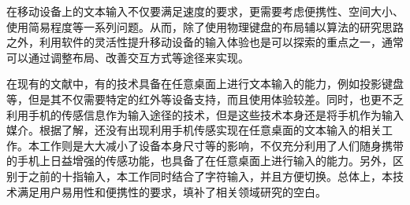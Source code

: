 在移动设备上的文本输入不仅要满足速度的要求，更需要考虑便携性、空间大小、使用简易程度等一系列问题。从而，除了使用物理键盘的布局辅以算法的研究思路之外，利用软件的灵活性提升移动设备的输入体验也是可以探索的重点之一，通常可以通过调整布局、改善交互方式等途径来实现。

在现有的文献中，有的技术具备在任意桌面上进行文本输入的能力，例如投影键盘等，但是其不仅需要特定的红外等设备支持，而且使用体验较差。同时，也更不乏利用手机的传感信息作为输入途径的技术，但是这些技术本身还是将手机作为输入媒介。根据了解，还没有出现利用手机传感实现在任意桌面的文本输入的相关工作。本工作则是大大减小了设备本身尺寸等的影响，不仅充分利用了人们随身携带的手机上日益增强的传感功能，也具备了在任意桌面上进行输入的能力。另外，区别于之前的十指输入，本工作同时结合了字符输入，并且方便切换。总体上，本技术满足用户易用性和便携性的要求，填补了相关领域研究的空白。